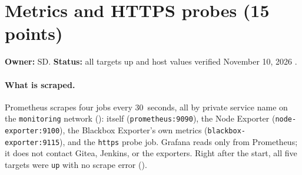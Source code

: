 \begin{longlisting}
\inputminted[fontsize=\scriptsize]{text}{evidence/112-monitoring-stack-deployed-digests-targets-probes-host-values-sd-2026-11-10.txt}
\caption{Deployment: pull and start, container settings, pulled digests, Prometheus targets, first probe results, host values, Grafana limit change, November 10, 2026 (real output).}
\label{Listing:E112}
\end{longlisting}

\begin{longlisting}
\inputminted[fontsize=\scriptsize]{text}{evidence/115-prometheus-grafana-restart-persistence-test-sd-2026-11-11.txt}
\caption{Restart test of Prometheus and Grafana: state before and after, readiness times, collection gap, and the corrected dashboard check, November 11, 2026 (real output).}
\label{Listing:E115}
\end{longlisting}

\section{Metrics and HTTPS probes (15 points)}\label{Section:sreMetrics}
\textbf{Owner:} SD. \textbf{Status:} all targets up and host values verified November 10, 2026 \StatusPass.

\paragraph{What is scraped.} Prometheus scrapes four jobs every 30~seconds, all by private service name on the
\texttt{monitoring} network (): itself (\texttt{prometheus:9090}), the Node Exporter
(\texttt{node-exporter:9100}), the Blackbox Exporter's own metrics (\texttt{blackbox-exporter:9115}), and the
\texttt{https} probe job. Grafana reads only from Prometheus; it does not contact Gitea, Jenkins, or the exporters.
Right after the start, all five targets were \texttt{up} with no scrape error ().

\begin{longlisting}
\inputminted[fontsize=\scriptsize]{yaml}{config/monitoring/prometheus/prometheus.yml}
\caption{\texttt{prometheus.yml}: four jobs, 30\,s interval, and the multi-target relabelling that sends each URL to the Blackbox Exporter.}
\label{Listing:ESrePrometheus}
\end{longlisting}

